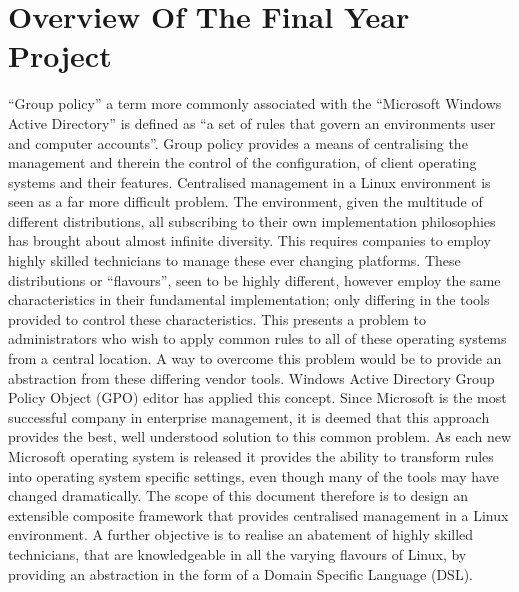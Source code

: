 \vspace{-2mm}
\section{Overview Of The Final Year Project}
	
	\normalsize
	{	
		``Group policy'' a term more commonly associated with the ``Microsoft Windows Active Directory'' is defined as ``a set of rules
		that govern an environments user and computer accounts''.  Group policy provides a means of centralising the 
		management and therein the control of the configuration, of client operating systems and their features.  
		\newline
		\newline
		Centralised management in a Linux environment is seen as a far more difficult problem.  
		The environment, given the multitude of different distributions, all subscribing to their own 
		implementation philosophies has brought about almost infinite diversity.  This requires companies to 
		employ highly skilled technicians to manage these ever changing platforms.  
		These distributions or ``flavours'', seen to be highly different, however employ the same characteristics 
		in their fundamental implementation; only differing in the tools provided to control these characteristics.	
		\newline
		\newline		
		This presents a problem to administrators who wish to apply common rules to all of these operating systems from a central location.   
		A way to overcome this problem would be to provide an abstraction from these differing vendor tools.
		\newline		
		\newline
		Windows Active Directory Group Policy Object (GPO) editor has applied this concept.  Since Microsoft is the most successful company 
		in enterprise management, it is deemed that this approach provides the best, well understood solution to this common problem.  
		As each new Microsoft operating system is released it provides the ability to transform rules into operating system specific settings, 
		even though many of the tools may have changed dramatically.  
		\newline
		\newline
		The scope of this document therefore is to design an extensible composite framework that provides centralised
		management in a Linux environment.  A further objective is to realise an abatement of highly skilled technicians, that are 
		knowledgeable in all the varying flavours of Linux, by providing an abstraction in the form of a Domain Specific Language (DSL).				
	}

	